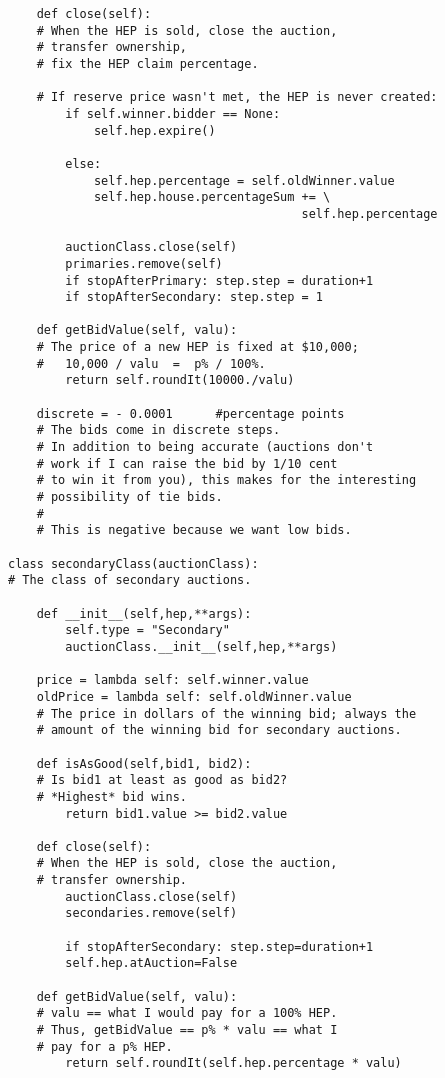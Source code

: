 \begin{lstlisting}
    def close(self):
    # When the HEP is sold, close the auction,
    # transfer ownership,
    # fix the HEP claim percentage.

    # If reserve price wasn't met, the HEP is never created:
        if self.winner.bidder == None:
            self.hep.expire()
            
        else:
            self.hep.percentage = self.oldWinner.value
            self.hep.house.percentageSum += \
                                         self.hep.percentage    
            
        auctionClass.close(self)
        primaries.remove(self)
        if stopAfterPrimary: step.step = duration+1
        if stopAfterSecondary: step.step = 1
        
    def getBidValue(self, valu):
    # The price of a new HEP is fixed at $10,000;
    #   10,000 / valu  =  p% / 100%.
        return self.roundIt(10000./valu)

    discrete = - 0.0001      #percentage points
    # The bids come in discrete steps.
    # In addition to being accurate (auctions don't
    # work if I can raise the bid by 1/10 cent
    # to win it from you), this makes for the interesting
    # possibility of tie bids.
    #
    # This is negative because we want low bids.

class secondaryClass(auctionClass):
# The class of secondary auctions.

    def __init__(self,hep,**args):
        self.type = "Secondary"
        auctionClass.__init__(self,hep,**args)

    price = lambda self: self.winner.value
    oldPrice = lambda self: self.oldWinner.value
    # The price in dollars of the winning bid; always the
    # amount of the winning bid for secondary auctions.

    def isAsGood(self,bid1, bid2):
    # Is bid1 at least as good as bid2?
    # *Highest* bid wins.
        return bid1.value >= bid2.value

    def close(self):
    # When the HEP is sold, close the auction,
    # transfer ownership.
        auctionClass.close(self)
        secondaries.remove(self)

        if stopAfterSecondary: step.step=duration+1
        self.hep.atAuction=False

    def getBidValue(self, valu):
    # valu == what I would pay for a 100% HEP.
    # Thus, getBidValue == p% * valu == what I 
    # pay for a p% HEP.
        return self.roundIt(self.hep.percentage * valu)


\end{lstlisting}
